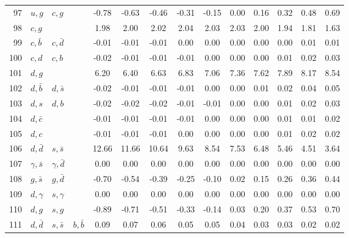 \begin{tabularx}{\textwidth}{rXXX@{}S@{}S@{}S@{}S@{}S@{}S@{}S@{}S@{}S@{}S}
 97 & $u, g$           & $c, g$            &                  & -0.78 & -0.63 & -0.46 & -0.31 & -0.15 &  0.00 &  0.16 &  0.32 &  0.48 &  0.69 \\
 98 & $c, g$           &                   &                  &  1.98 &  2.00 &  2.02 &  2.04 &  2.03 &  2.03 &  2.00 &  1.94 &  1.81 &  1.63 \\
 99 & $c, \bar b$      & $c, \bar d$       &                  & -0.01 & -0.01 & -0.01 &  0.00 &  0.00 &  0.00 &  0.00 &  0.00 &  0.01 &  0.01 \\
100 & $c, d$           & $c, b$            &                  & -0.02 & -0.01 & -0.01 & -0.01 &  0.00 &  0.00 &  0.00 &  0.01 &  0.02 &  0.03 \\
101 & $d, g$           &                   &                  &  6.20 &  6.40 &  6.63 &  6.83 &  7.06 &  7.36 &  7.62 &  7.89 &  8.17 &  8.54 \\
102 & $d, \bar b$      & $d, \bar s$       &                  & -0.02 & -0.01 & -0.01 & -0.01 &  0.00 &  0.00 &  0.01 &  0.02 &  0.04 &  0.05 \\
103 & $d, s$           & $d, b$            &                  & -0.02 & -0.02 & -0.02 & -0.01 & -0.01 &  0.00 &  0.00 &  0.01 &  0.02 &  0.03 \\
104 & $d, \bar c$      &                   &                  & -0.01 & -0.01 & -0.01 & -0.01 &  0.00 &  0.00 &  0.00 &  0.01 &  0.01 &  0.02 \\
105 & $d, c$           &                   &                  & -0.01 & -0.01 & -0.01 &  0.00 &  0.00 &  0.00 &  0.00 &  0.01 &  0.02 &  0.02 \\
106 & $d, \bar d$      & $s, \bar s$       &                  & 12.66 & 11.66 & 10.64 &  9.63 &  8.54 &  7.53 &  6.48 &  5.46 &  4.51 &  3.64 \\
107 & $\gamma, \bar s$ & $\gamma, \bar d$  &                  &  0.00 &  0.00 &  0.00 &  0.00 &  0.00 &  0.00 &  0.00 &  0.00 &  0.00 &  0.00 \\
108 & $g, \bar s$      & $g, \bar d$       &                  & -0.70 & -0.54 & -0.39 & -0.25 & -0.10 &  0.02 &  0.15 &  0.26 &  0.36 &  0.44 \\
109 & $d, \gamma$      & $s, \gamma$       &                  &  0.00 &  0.00 &  0.00 &  0.00 &  0.00 &  0.00 &  0.00 &  0.00 &  0.00 &  0.00 \\
110 & $d, g$           & $s, g$            &                  & -0.89 & -0.71 & -0.51 & -0.33 & -0.14 &  0.03 &  0.20 &  0.37 &  0.53 &  0.70 \\
111 & $d, \bar d$      & $s, \bar s$       & $b, \bar b$      &  0.09 &  0.07 &  0.06 &  0.05 &  0.05 &  0.04 &  0.03 &  0.03 &  0.02 &  0.02 \\

\end{tabularx}
